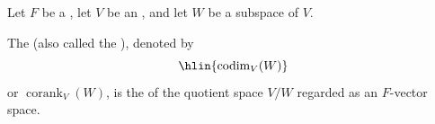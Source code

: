 \begin{definition} \label{definition:codimension_and_corank_of_a_subspace_of_a_vector_space_over_a_field}
Let $F$ be a , let $V$ be an , and let $W$ be a subspace of $V$.

The  (also called the ), denoted by
$$\hlin{\operatorname{codim}_V(W)}$$
or $\operatorname{corank}_V(W)$, is the  of the quotient space $V/W$ regarded as an $F$-vector space.
\end{definition}
